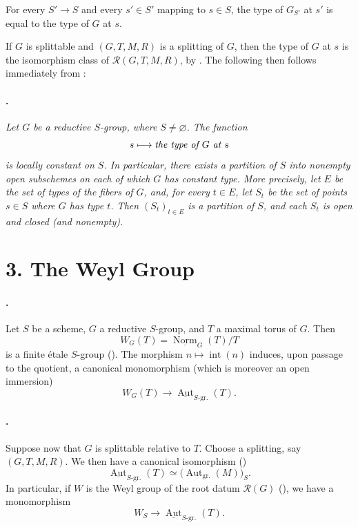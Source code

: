 For every \(S'\to S\) and every \(s'\in S'\) mapping to \(s\in S\),
the type of \(G_{S'}\) at \(s'\) is equal to the type of \(G\) at
\(s\).

If \(G\) is splittable and \((G,T,M,R)\) is a splitting of \(G\),
then the type of \(G\) at \(s\) is the isomorphism class of
\(\mathcal R(G,T,M,R)\), by \footnotemark[5]. The following
then follows immediately from :

\paragraph{.}
\textit{Let \(G\) be a reductive \(S\)-group, where
\(S\ne\varnothing\). The function}
\[
  s\longmapsto\text{\textit{the type of \(G\) at \(s\)}}
\]
\textit{is locally constant on \(S\). In particular, there exists a
partition of \(S\) into nonempty open subschemes on each of which
\(G\) has constant type. More precisely, let \(E\) be the set of
types of the fibers of \(G\), and, for every \(t\in E\), let \(S_t\)
be the set of points \(s\in S\) where \(G\) has type \(t\). Then
\((S_t)_{t\in E}\) is a partition of \(S\), and each \(S_t\) is open
and closed \textup{(and nonempty)}.}

\section*{3. The Weyl Group}

\paragraph{.}
Let \(S\) be a scheme, \(G\) a reductive \(S\)-group, and \(T\) a
maximal torus of \(G\). Then
\[
  W_G(T)=\underline{\operatorname{Norm}}_G(T)/T
\]
is a finite étale \(S\)-group \textup{()}. The
morphism \(n\mapsto\operatorname{int}(n)\) induces, upon passage to
the quotient, a canonical monomorphism \textup{(which is moreover an
open immersion)}
\[
  W_G(T)\longrightarrow
  \underline{\operatorname{Aut}}_{S\text{-gr.}}(T).
\]

\paragraph{.}
Suppose now that \(G\) is splittable relative to \(T\). Choose a
splitting, say \((G,T,M,R)\). We then have a canonical isomorphism
\textup{()}
\[
  \underline{\operatorname{Aut}}_{S\text{-gr.}}(T)
  \simeq
  \bigl(\operatorname{Aut}_{\mathrm{gr.}}(M)\bigr)_S.
\]
In particular, if \(W\) is the Weyl group of the root datum
\(\mathcal R(G)\) \textup{()}, we have a
monomorphism
\[
  W_S\longrightarrow
  \underline{\operatorname{Aut}}_{S\text{-gr.}}(T).
\]

